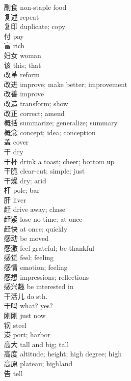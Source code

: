 副食 \quad non-staple food\\
复述 \quad repeat\\
复印 \quad duplicate; copy\\
付 \quad pay\\
富 \quad rich\\
妇女 \quad woman\\
该 \quad this; that\\
改革 \quad reform\\
改进 \quad improve; make better; improvement\\
改善 \quad improve\\
改造 \quad transform; show\\
改正 \quad correct; amend\\
概括 \quad summarize; generalize; summary\\
概念 \quad concept; idea; conception\\
盖 \quad cover\\
干 \quad dry\\
干杯 \quad drink a toast; cheer; bottom up\\
干脆 \quad clear-cut; simple; just\\
干燥 \quad dry; arid\\
杆 \quad pole; bar\\
肝 \quad liver\\
赶 \quad drive away; chase\\
赶紧 \quad lose no time; at once\\
赶快 \quad at once; quickly\\
感动 \quad be moved\\
感激 \quad feel grateful; be thankful\\
感觉 \quad feel; feeling\\
感情 \quad emotion; feeling\\
感想 \quad impressions; reflections\\
感兴趣 \quad be interested in\\
干活儿 \quad do sth.\\
干吗 \quad what? yes?\\
刚刚 \quad just now\\
钢 \quad steel\\
港 \quad port; harbor\\
高大 \quad tall and big; tall\\
高度 \quad altitude; height; high degree; high\\
高原 \quad plateau; highland\\
告 \quad tell\\
